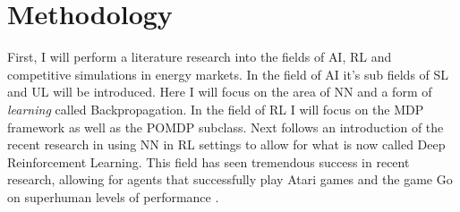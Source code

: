 % 
% 
% 
% 
% 
% 


\section{Methodology}
First, I will perform a literature research into the fields of \ac{AI}, \ac{RL} and competitive simulations in energy
markets. In the field of AI
it's sub fields of \ac {SL}  and \ac {UL}  will be introduced. Here I will focus on the area of \ac{NN} and a form of
\emph{learning}  called Backpropagation. In the field of \ac{RL} I will focus on the \ac{MDP} framework as well as the
\ac{POMDP} subclass.  Next follows an introduction of the recent research in using \ac{NN} in \ac{RL} settings to allow
for what is now called Deep Reinforcement Learning. This field has seen tremendous success in recent research, allowing
for agents that successfully play Atari games and the game Go on superhuman levels of performance 
\citep{proximalpolicyopt, silver2016mastering}.

